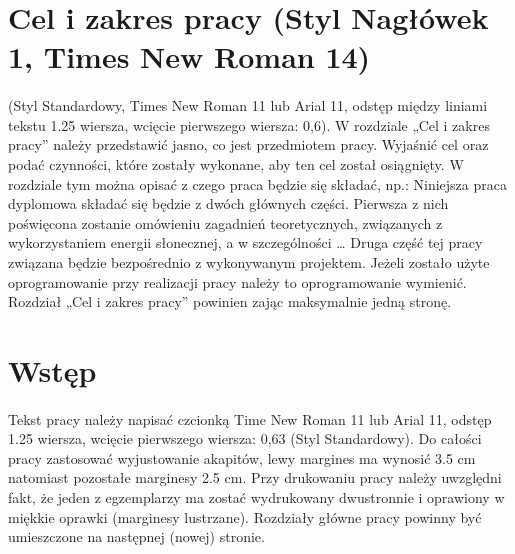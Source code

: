\documentclass[11pt,a4paper]{article}
\begin{document}




\renewcommand{\contentsname}{\LARGE \normalfont \MakeUppercase{Spis treści} (Times New Roman 16)}

{\fontsize{12}{16}\selectfont
\tableofcontents
}

\newpage


\section{Cel i zakres pracy (Styl Nagłówek 1, Times New Roman 14)}
\paragraph{}
(Styl Standardowy, Times New Roman 11 lub Arial 11, odstęp między liniami tekstu 1.25 wiersza, wcięcie pierwszego wiersza: 0,6). W rozdziale „Cel i zakres pracy” należy przedstawić jasno, co jest przedmiotem pracy. Wyjaśnić cel oraz podać czynności, które zostały wykonane, aby ten cel został osiągnięty. W rozdziale tym można opisać z czego praca będzie się składać, np.: 
Niniejsza praca dyplomowa składać się będzie z dwóch głównych części. Pierwsza z nich poświęcona zostanie omówieniu zagadnień teoretycznych, związanych z wykorzystaniem energii słonecznej, a w szczególności … Druga część tej pracy związana będzie bezpośrednio z wykonywanym projektem.
Jeżeli zostało użyte oprogramowanie przy realizacji pracy należy to oprogramowanie wymienić. Rozdział „Cel i zakres pracy” powinien zając maksymalnie jedną stronę. 

\newpage

\section{Wstęp}
\paragraph{}
Tekst pracy należy napisać czcionką Time New Roman 11 lub Arial 11, odstęp 1.25 wiersza, wcięcie pierwszego wiersza: 0,63 (Styl Standardowy). Do całości pracy zastosować wyjustowanie akapitów, lewy margines ma wynosić 3.5 cm natomiast pozostałe marginesy 2.5 cm. Przy drukowaniu pracy należy uwzględni fakt, że jeden z egzemplarzy ma zostać wydrukowany dwustronnie i oprawiony w miękkie oprawki (marginesy lustrzane). Rozdziały główne pracy powinny być umieszczone na następnej (nowej) stronie.
\end{document}
